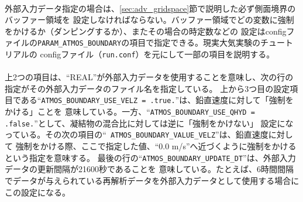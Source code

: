 \\

\noindent 外部入力データ指定の場合は、\ref{sec:adv_gridspace}節で説明した必ず側面境界のバッファー領域を
設定しなければならない。バッファー領域でどの変数に強制をかけるか（ダンピングするか）、またその場合の時定数などの
設定はconfigファイルの\verb|PARAM_ATMOS_BOUNDARY|の項目で指定できる。現実大気実験のチュートリアルの
configファイル（\verb|run.conf|）を元にして一部の項目を説明する。\\

\\

上2つの項目は、``REAL''が外部入力データを使用することを意味し、次の行の指定がその外部入力データのファイル名を指定している。
上から3つ目の設定項目である``\verb|ATMOS_BOUNDARY_USE_VELZ = .true.|''は、鉛直速度に対して「強制をかける」ことを
意味している。一方、``\verb|ATMOS_BOUNDARY_USE_QHYD = .false.|''として、凝結物の混合比に対しては逆に「強制をかけない」
設定になっている。その次の項目の``\verb| ATMOS_BOUNDARY_VALUE_VELZ|''は、鉛直速度に対して
強制をかける際、ここで指定した値、``0.0 m/s''へ近づくように強制をかけるという指定を意味する。
最後の行の``\verb|ATMOS_BOUNDARY_UPDATE_DT|''は、外部入力データの更新間隔が21600秒であることを
意味している。たとえば、6時間間隔でデータが与えられている再解析データを外部入力データとして使用する場合にこの設定になる。

